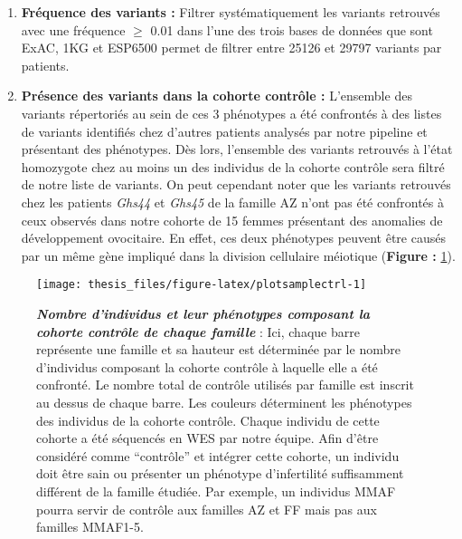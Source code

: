 \documentclass[12pt,twoside]{ugathesis}
\begin{document}
\begin{enumerate}
\def\labelenumi{\arabic{enumi}.}
\setcounter{enumi}{4}
\item
  \textbf{Fréquence des variants :} Filtrer systématiquement les
  variants retrouvés avec une fréquence \(\ge\) 0.01 dans l'une des
  trois bases de données que sont ExAC, 1KG et ESP6500 permet de filtrer
  entre 25126 et 29797 variants par patients.
\item
  \textbf{Présence des variants dans la cohorte contrôle :} L'ensemble
  des variants répertoriés au sein de ces 3 phénotypes a été confrontés
  à des listes de variants identifiés chez d'autres patients analysés
  par notre pipeline et présentant des phénotypes. Dès lors, l'ensemble
  des variants retrouvés à l'état homozygote chez au moins un des
  individus de la cohorte contrôle sera filtré de notre liste de
  variants. On peut cependant noter que les variants retrouvés chez les
  patients \emph{Ghs44} et \emph{Ghs45} de la famille AZ n'ont pas été
  confrontés à ceux observés dans notre cohorte de 15 femmes présentant
  des anomalies de développement ovocitaire. En effet, ces deux
  phénotypes peuvent être causés par un même gène impliqué dans la
  division cellulaire méiotique (\textbf{Figure :}
  \ref{fig:plotsamplectrl}).\\
  \newpage
\end{enumerate}

\begin{figure}

{\centering \texttt{[image: thesis\_files/figure-latex/plotsamplectrl-1]} 

}

\caption[Nombre d'individus et leur phénotypes composant la cohorte contrôle de chaque famille]{\textbf{\emph{Nombre d'individus et leur phénotypes
composant la cohorte contrôle de chaque famille}} : Ici, chaque barre
représente une famille et sa hauteur est déterminée par le nombre
d'individus composant la cohorte contrôle à laquelle elle a été
confronté. Le nombre total de contrôle utilisés par famille est inscrit
au dessus de chaque barre. Les couleurs déterminent les phénotypes des
individus de la cohorte contrôle. Chaque individu de cette cohorte a été
séquencés en WES par notre équipe. Afin d'être considéré comme
``contrôle'' et intégrer cette cohorte, un individu doit être sain ou
présenter un phénotype d'infertilité suffisamment différent de la
famille étudiée. Par exemple, un individus MMAF pourra servir de
contrôle aux familles AZ et FF mais pas aux familles MMAF1-5.}\label{fig:plotsamplectrl}
\end{figure}
\end{document}

